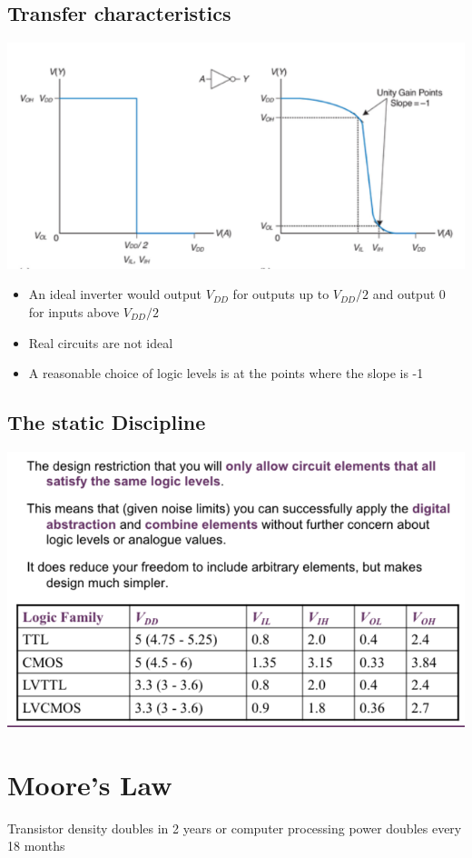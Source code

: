 \documentclass{article}[18pt]
\begin{document}
\subsection{Transfer characteristics}
\includegraphics[width=15cm]{TransferChar.png}\\
\begin{itemize}
\item An ideal inverter would output $V_{DD}$ for outputs up to $V_{DD}/2$ and output 0 for inputs above $V_{DD}/2$
\item Real circuits are not ideal
\item A reasonable choice of logic levels is at the points where the slope is -1
\end{itemize}
\subsection{The static Discipline}
\includegraphics[width=15cm]{StatDis.png}
\section{Moore's Law}
Transistor density doubles in 2 years or computer processing power doubles every 18 months
\end{document}
